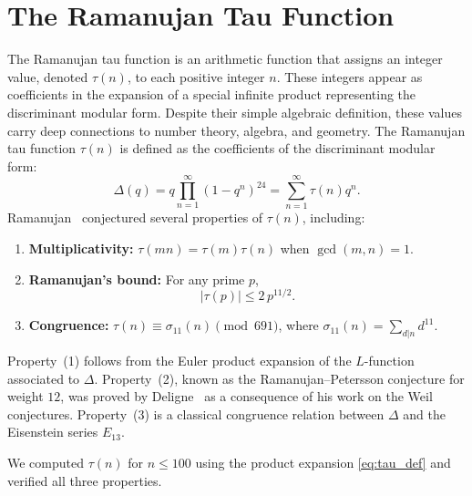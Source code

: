 \documentclass[10pt]{amsart}
\theoremstyle{plain}
\theoremstyle{definition}
\theoremstyle{remark}
\begin{document}
\section{The Ramanujan Tau Function}
\label{sec:tau}

The Ramanujan tau function is an arithmetic function that assigns an integer value, denoted $\tau(n)$, to each positive integer $n$. These integers appear as coefficients in the expansion of a special infinite product representing the discriminant modular form. Despite their simple algebraic definition, these values carry deep connections to number theory, algebra, and geometry. The Ramanujan tau function $\tau(n)$ is defined as the coefficients of the discriminant modular form:
\begin{equation}
\label{eq:tau_def}
\Delta(q) = q \prod_{n=1}^{\infty} (1-q^n)^{24}
= \sum_{n=1}^{\infty} \tau(n) q^n.
\end{equation}
Ramanujan~\cite{ramanujan_1916} conjectured several properties of
$\tau(n)$, including:

\begin{enumerate}
\item \textbf{Multiplicativity:} $\tau(mn) = \tau(m)\tau(n)$ when
$\gcd(m,n)=1$.

\item \textbf{Ramanujan's bound:} For any prime $p$,
\begin{equation}
\label{eq:ramanujan_bound}
|\tau(p)| \leq 2\,p^{11/2}.
\end{equation}

\item \textbf{Congruence:} $\tau(n) \equiv \sigma_{11}(n) \pmod{691}$,
where $\sigma_{11}(n) = \sum_{d|n} d^{11}$.
\end{enumerate}

Property~(1) follows from the Euler product expansion of the $L$-function
associated to $\Delta$. Property~(2), known as the
Ramanujan--Petersson conjecture for weight $12$, was proved by
Deligne~\cite{deligne_1974} as a consequence of his work on the Weil
conjectures. Property~(3) is a classical congruence relation between
$\Delta$ and the Eisenstein series $E_{13}$.

We computed $\tau(n)$ for $n \leq 100$ using the product expansion
\eqref{eq:tau_def} and verified all three properties.
\end{document}
